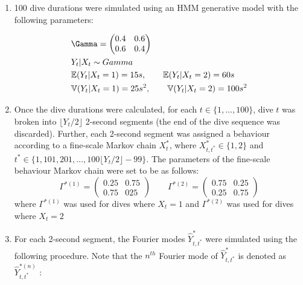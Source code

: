 \begin{enumerate}
	\item 100 dive durations were simulated using an HMM generative model with the following parameters:
	
	\begin{align*}
		&\Gamma = \begin{pmatrix} 0.4 & 0.6 \\ 0.6 & 0.4 \end{pmatrix} \\
		&Y_t|X_t \sim Gamma \\
		&\bbE(Y_t|X_t = 1) = 15 s, \quad \quad \bbE(Y_t|X_t = 2) = 60 s \\
		&\bbV(Y_t|X_t = 1) = 25 s^2, \quad \quad  \bbV(Y_t|X_t = 2) = 100 s^2
	\end{align*}
	
	\item Once the dive durations were calculated, for each $t \in \{1, \ldots, 100\}$, dive $t$ was broken into $\lfloor Y_t/2 \rfloor$ 2-second segments (the end of the dive sequence was discarded). Further, each 2-second segment was assigned a behaviour according to a fine-scale Markov chain $X^*_t$, where $X^*_{t,t^*} \in \{1,2\}$ and $t^* \in \{1,101,201,\ldots,100\lfloor Y_t/2 \rfloor - 99\}$. The parameters of the fine-scale behaviour Markov chain were set to be as follows:
	$$\Gamma^{*(1)} = \begin{pmatrix} 0.25 & 0.75 \\ 0.75 & 025 \end{pmatrix} \qquad 	\Gamma^{*(2)} = \begin{pmatrix} 0.75 & 0.25 \\ 0.25 & 0.75 \end{pmatrix}$$
	where $\Gamma^{*(1)}$ was used for dives where $X_t = 1$ and $\Gamma^{*(2)}$ was used for dives where $X_t = 2$
	
	\item For each 2-second segment, the Fourier modes $\hat{Y}^*_{t,t^*}$ were simulated using the following procedure. Note that the $n^{th}$ Fourier mode of $\hat{Y}^*_{t,t^*}$ is denoted as $\hat{Y}^{*(n)}_{t,t^*}$ :
	

\end{enumerate}
